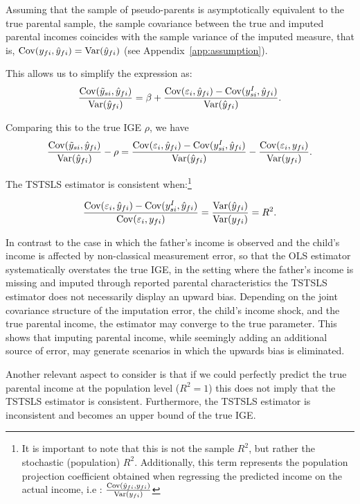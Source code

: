 Assuming that the sample of pseudo-parents is asymptotically equivalent to the true parental sample, the sample covariance between the true and imputed parental incomes coincides with the sample variance of the imputed measure, that is, $\operatorname{Cov}(y_{fi}, \hat{y}_{fi}) = \operatorname{Var}(\hat{y}_{fi})$ (see Appendix~\ref{app:assumption}).

 This allows us to simplify the expression as:
\[
\frac{\operatorname{Cov}(\tilde y_{si}, \hat{y}_{fi})}{\operatorname{Var}(\hat{y}_{fi})} = \beta + \frac{\operatorname{Cov}(\varepsilon_i, \hat{y}_{fi}) - \operatorname{Cov}(y_{si}^I, \hat{y}_{fi})}{\operatorname{Var}(\hat{y}_{fi})}.
\]


Comparing this to the true IGE $\rho$, we have
\[
\frac{\operatorname{Cov}(\tilde y_{si}, \hat{y}_{fi})}{\operatorname{Var}(\hat{y}_{fi})} - \rho = \frac{\operatorname{Cov}(\varepsilon_i, \hat{y}_{fi}) - \operatorname{Cov}(y_{si}^I, \hat{y}_{fi})}{\operatorname{Var}(\hat{y}_{fi})} - \frac{\operatorname{Cov}(\varepsilon_i, y_{fi})}{\operatorname{Var}(y_{fi})}.
\]

The TSTSLS estimator is consistent when:\footnote{
It is important to note that this is not the sample $R^2$, but rather the stochastic (population) $R^2$. 
Additionally, this term represents the population projection coefficient obtained when regressing the predicted income on the actual income, i.e : 
$\frac{\operatorname{Cov}(\hat{y}_{fi},y_{fi})}{\operatorname{Var}(y_{fi})}$}


\[
\frac{\operatorname{Cov}(\varepsilon_i, \hat{y}_{fi}) - \operatorname{Cov}(y_{si}^I, \hat{y}_{fi})}{\operatorname{Cov}(\varepsilon_i, y_{fi})} = \frac{\operatorname{Var}(\hat{y}_{fi})}{\operatorname{Var}(y_{fi})} = R^2. 
\]

In contrast to the case in which the father’s income is observed and the child’s income is affected by non-classical measurement error, so that the OLS estimator systematically overstates the true IGE, in the setting where the father’s income is missing and imputed through reported parental characteristics the TSTSLS estimator does not necessarily display an upward bias. Depending on the joint covariance structure of the imputation error, the child’s income shock, and the true parental income, the estimator may converge to the true parameter. This shows that imputing parental income, while seemingly adding an additional source of error, may generate scenarios in which the upwards bias is eliminated.

Another relevant aspect to consider is that if we could perfectly predict the true parental income at the population level ($R^2 = 1$) this does not imply that the TSTSLS estimator is consistent. Furthermore, the TSTSLS estimator is  inconsistent and becomes an upper bound of the true IGE. 

